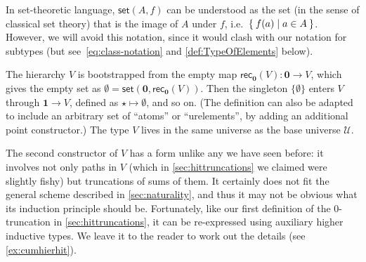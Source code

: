 \documentclass[10pt,a4paper]{article}
\let\setof\Set    %
\newcommand{\rec}[1]{\mathsf{rec}_{#1}}
\newcommand{\UU}{\ensuremath{\mathcal{U}}\xspace}
\newcommand{\emptyt}{\ensuremath{\mathbf{0}}\xspace}
\newcommand{\unit}{\ensuremath{\mathbf{1}}\xspace}
\newcommand{\ttt}{\ensuremath{\star}\xspace}
\newcommand{\vset}{\mathsf{set}}  %
\theoremstyle{definition}
\theoremstyle{remark}
\numberwithin{equation}{section}
\begin{document}
In set-theoretic language, $\vset(A,f)$ can be understood as the set (in the sense of classical set theory) that is the image of $A$ under $f$, i.e.\ $\setof{ f(a) | a \in A }$.
However, we will avoid this notation, since it would clash with our notation for subtypes (but see~\eqref{eq:class-notation} and \cref{def:TypeOfElements} below).

The hierarchy $V$ is
bootstrapped from the empty map $\rec\emptyt(V) : \emptyt \to V$, which gives the empty set as $\emptyset = \vset(\emptyt,\rec\emptyt(V))$.
Then the singleton $\{\emptyset\}$ enters $V$ through $\unit \to V$, defined as $\ttt \mapsto \emptyset$, and so
on.
(The definition can also be adapted to include an arbitrary set of ``atoms'' or ``urelements'', by adding an additional point constructor.)
The type $V$ lives in the same universe as the base universe $\UU$.

The second constructor of $V$ has a form unlike any we have seen before: it involves not only paths in $V$ (which in \cref{sec:hittruncations} we claimed were slightly fishy) but truncations of sums of them.
It certainly does not fit the general scheme described in \cref{sec:naturality}, and thus it may not be obvious what its induction principle should be.
Fortunately, like our first definition of the 0-truncation in \cref{sec:hittruncations}, it can be re-expressed using auxiliary higher inductive types.
We leave it to the reader to work out the details (see \cref{ex:cumhierhit}).
\end{document}
